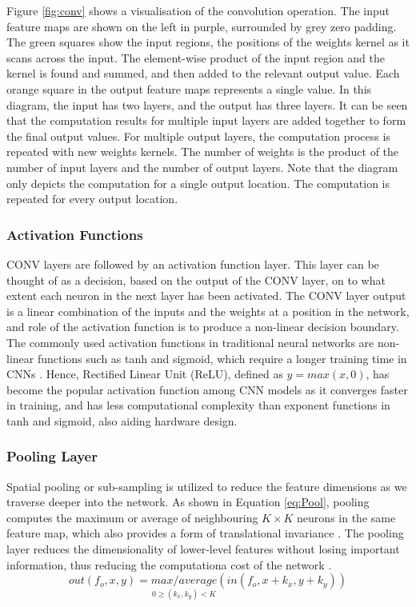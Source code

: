 \documentclass[12pt]{article}
\begin{document}
Figure \ref{fig:conv} shows a visualisation of the convolution operation. The input feature maps are shown on the left in purple, surrounded by grey zero padding. The green squares show the input regions, the positions of the weights kernel as it scans across the input. The element-wise product of the input region and the kernel is found and summed, and then added to the relevant output value. Each orange square in the output feature maps represents a single value. In this diagram, the input has two layers, and the output has three layers. It can be seen that the computation results for multiple input layers are added together to form the final output values. For multiple output layers, the computation process is repeated with new weights kernels. The number of weights is the product of the number of input layers and the number of output layers. Note that the diagram only depicts the computation for a single output location. The computation is repeated for every output location. 


\subsubsection{Activation Functions}
\label{sec:Background-CNN-Activation}

CONV layers are followed by an activation function layer. This layer can be thought of as a decision, based on the output of the CONV layer, on to what extent each neuron in the next layer has been activated. The CONV layer output is a linear combination of the inputs and the weights at a position in the network, and role of the activation function is to produce a non-linear decision boundary. The commonly used activation functions in traditional neural networks are non-linear functions such as tanh and sigmoid, which require a longer training time in CNNs \cite{AlexNet}. Hence, Rectified Linear Unit (ReLU), defined as $y = max(x,0)$, has become the popular activation function among CNN models as it converges faster in training, and has less computational complexity than exponent functions in tanh and sigmoid, also aiding hardware design.

\subsubsection{Pooling Layer}
\label{sec:Background-CNN-Pool}


Spatial pooling or sub-sampling is utilized to reduce the feature dimensions as we traverse deeper into the network. As shown in Equation \ref{eq:Pool}, pooling computes the maximum or average of neighbouring $K\times K$ neurons in the same feature map, which also provides a form of translational invariance \cite{PoolAnalysis}. The pooling layer reduces the dimensionality of lower-level features without losing important information, thus reducing the computationa cost of the network \cite{SudaFpgaAccelerator}.
\begin{equation}
out(f_o,x,y)=\underset{0\geqslant (k_x,k_y)<K}{max/average}(in(f_o,x+k_x,y+k_y))
\label{eq:Pool}
\end{equation}
\end{document}
